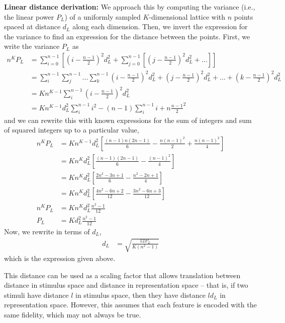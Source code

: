 \documentclass[letter,12pt]{article}
\begin{document}
\textbf{Linear distance derivation:}
We approach this by computing the variance (i.e., the linear power $P_{L}$)
of a uniformly sampled $K$-dimensional lattice with $n$ points spaced at distance
$d_{L}$ along each dimension. Then, we
invert the expression for the variance to find an expression for the distance
between the points. First, we write the variance $P_{L}$ as
\begin{align}
  n^{K} P_{L} &=  \sum_{i = 0}^{n - 1} \left[
    \left(i - \frac{n - 1}{2}\right)^{2}d_{L}^{2} + \sum_{j = 0}^{n - 1}
    \left[\left(j - \frac{n - 1}{2}\right)^{2}d_{L}^{2} + ... \right]\right] \\
  &= \sum_{i}^{n - 1} \sum_{j}^{n-1} ... \sum_{k}^{n - 1}
  \left(i - \frac{n - 1}{2}\right)^{2}d_{L}^{2} + 
  \left(j - \frac{n - 1}{2}\right)^{2}d_{L}^{2} + ... +
  \left(k - \frac{n - 1}{2}\right)^{2}d_{L}^{2} \\
  &= K n^{K - 1} \sum_{i}^{n - 1}
  \left(i - \frac{n - 1}{2}\right)^{2}d_{L}^{2} \\
  &= K n^{K - 1} d_{L}^{2}\sum_{i}^{n - 1} i^{2} - (n - 1) \sum_{i}^{n-1} i
  + n \frac{n - 1}{2}^{2}
\end{align}
and we can rewrite this with known expressions for the sum of integers
and sum of squared integers up to a particular value,
\begin{align}
  n^{K} P_{L} &= K n^{K - 1} d_{L}^{2}
  \left[\frac{(n - 1)n(2n - 1)}{6} - \frac{n(n - 1)^{2}}{2}
    + \frac{n(n - 1)^{2}}{4}\right] \\
  &= K n^{K} d_{L}^{2} \left[\frac{(n - 1)(2n - 1)}{6} - \frac{(n - 1)^{2}}{4}
    \right] \\
  &= K n^{K} d_{L}^{2} \left[\frac{2n^{2} - 3n + 1}{6}
    - \frac{n^{2} - 2n + 1}{4}\right] \\
  &= K n^{K} d_{L}^{2} \left[\frac{4n^{2} - 6n + 2}{12}
    - \frac{3n^{2} - 6n + 3}{12}\right] \\
  n^{K} P_{L} &= K n^{K} d_{L}^{2} \frac{n^{2} - 1}{12} \\
  P_{L} &= K d_{L}^{2} \frac{n^{2} - 1}{12} 
\end{align}
Now, we rewrite in terms of $d_{L}$,
\begin{align}
  d_{L} &= \sqrt{\frac{12 P_{L}}{K \left(n^{2} - 1\right)}}
\end{align}
which is the expression given above.

This distance can be used as a scaling factor that allows translation between
distance in stimulus space and distance in representation space -- that is,
if two stimuli have distance $l$ in stimulus space, then they have distance
$l d_{L}$ in representation space. However, this assumes that each feature is
encoded with the same fidelity, which may not always be true.
\end{document}

